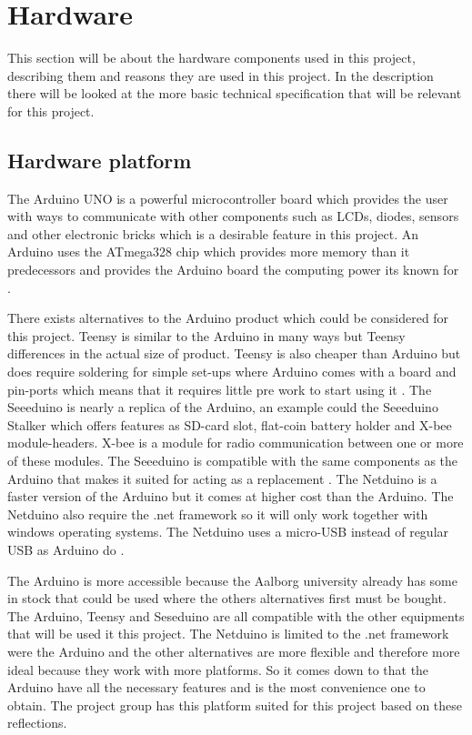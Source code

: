 \section{Hardware}
This section will be about the hardware components used in this project, describing them and reasons they are used in this project. In the description there will be looked at the more basic technical specification that will be relevant for this project.

\subsection{Hardware platform}
The Arduino UNO is a powerful microcontroller board which provides the user with ways to communicate with other components such as LCDs, diodes, sensors and other electronic bricks which is a desirable feature in this project. An Arduino uses the ATmega328 chip which provides more memory than it predecessors and provides the Arduino board the computing power its known for \citep{ArduinoUno}.

There exists alternatives to the Arduino product which could be considered for this project. Teensy is similar to the Arduino in many ways but Teensy differences in the actual size of product. Teensy is also cheaper than Arduino but does require soldering for simple set-ups where Arduino comes with a board and pin-ports which means that it requires little pre work to start using it \citep{Teensy}.
The Seeeduino is nearly a replica of the Arduino, an example could the Seeeduino Stalker which offers features as SD-card slot, flat-coin battery holder and X-bee module-headers. X-bee is a module for radio communication between one or more of these modules. The Seeeduino is compatible with the same components as the Arduino that makes it suited for acting as a replacement \citep{Seedui}.
The Netduino is a faster version of the Arduino but it comes at higher cost than the Arduino. The Netduino also require the .net framework so it will only work together with windows operating systems. The Netduino uses a micro-USB instead of regular USB as Arduino do \citep{Netdui}.

The Arduino is more accessible because the Aalborg university already has some in stock that could be used where the others alternatives first must be bought. The Arduino, Teensy and Seseduino are all compatible with the other equipments that will be used it this project. The Netduino is limited to the .net framework were the Arduino and the other alternatives are more flexible and therefore more ideal because they work with more platforms.
So it comes down to that the Arduino have all the necessary features and is the most convenience one to obtain. The project group has this platform suited for this project based on these reflections. 

